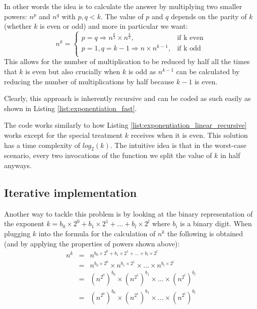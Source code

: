 In other words the idea is to calculate the answer by multiplying two smaller powers: $n^p$ and $n^q$ with $p,q < k$. The value of $p$ and $q$ depends on the parity of $k$ (whether $k$ is even or odd) and more in particular we want:
  \[
    n^k = \begin{cases}
                p=q \Longrightarrow n^{\frac{k}{2}} \times n^{\frac{k}{2}}, & \text{if  k even}\\
                p=1, q=k-1 \Longrightarrow n \times n^{k-1}, & \text{if k odd}\\
            \end{cases}
  \]
This allows for the number of multiplication to be reduced by half all the times that $k$ is even but also crucially when $k$ is odd as $n^{k-1}$ can be calculated by reducing the number of multiplications by half because $k-1$ is even.

Clearly, this approach is inherently recursive and
can be coded as such easily as shown in Listing \ref{list:exponentiation_fast}.



The code works similarly to how Listing \ref{list:exponentiation_linear_recursive} works except for the special treatment $k$ receives when it is even. This solution has a time complexity of $log_2(k)$. The intuitive idea is that in the worst-case scenario, every two invocations of the  function we split the value of $k$ in half anyways.



\subsection{Iterative implementation}

Another way to tackle this problem is by looking at the binary representation of the exponent $k =
b_0 \times 2^0 + b_1 \times 2^1 + \ldots + b_l \times 2^l$ where $b_i$ is a binary digit.
When plugging $k$ into the formula for the calculation of $n^k$ the following is obtained (and by applying the properties of powers shown above):
\[
    \begin{array}{lcl}
        n^k & = &  n^{b_0 \times 2^0 + b_1 \times 2^1 + \ldots + b_l \times 2^l} \\
        & = & n^{b_0 \times 2^0} \times n^{b_1 \times 2^1} \times \ldots \times n^{b_l \times 2^l} \\
        & = & (n^{2^0})^{b_0} \times  (n^{2^1})^{b_1} \times \ldots \times (n^{2^l})^{b_l} \\
        & = & (n^{2^0})^{b_0} \times  (n^{2^1})^{b_1} \times \ldots \times (n^{2^l})^{b_l} 
    \end{array}
\]

